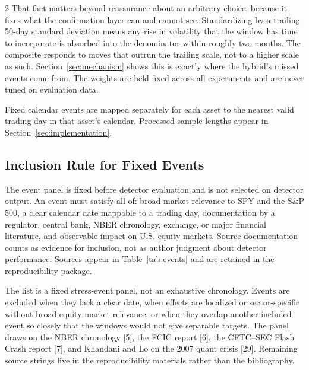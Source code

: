 \documentclass{book}
\begin{document}
\begin{multicols}{2}
That fact matters beyond reassurance about an arbitrary choice, because it fixes what the confirmation layer can and cannot see. Standardizing by a trailing 50-day standard deviation means any rise in volatility that the window has time to incorporate is absorbed into the denominator within roughly two months. The composite responds to moves that outrun the trailing scale, not to a higher scale as such. Section~\ref{sec:mechanism} shows this is exactly where the hybrid's missed events come from. The weights are held fixed across all experiments and are never tuned on evaluation data.

Fixed calendar events are mapped separately for each asset to the nearest valid trading day in that asset's calendar. Processed sample lengths appear in Section~\ref{sec:implementation}.

\subsection{Inclusion Rule for Fixed Events}
The event panel is fixed before detector evaluation and is not selected on detector output. An event must satisfy all of: broad market relevance to SPY and the S\&P 500, a clear calendar date mappable to a trading day, documentation by a regulator, central bank, NBER chronology, exchange, or major financial literature, and observable impact on U.S. equity markets. Source documentation counts as evidence for inclusion, not as author judgment about detector performance. Sources appear in Table~\ref{tab:events} and are retained in the reproducibility package.

The list is a fixed stress-event panel, not an exhaustive chronology. Events are excluded when they lack a clear date, when effects are localized or sector-specific without broad equity-market relevance, or when they overlap another included event so closely that the windows would not give separable targets. The panel draws on the NBER chronology [5], the FCIC report [6], the CFTC--SEC Flash Crash report [7], and Khandani and Lo on the 2007 quant crisis [29]. Remaining source strings live in the reproducibility materials rather than the bibliography.
\end{multicols}
\end{document}
